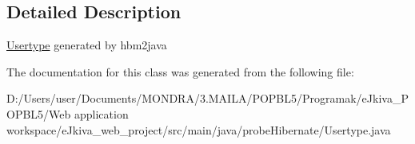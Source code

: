 \subsection{Detailed Description}
\mbox{\hyperlink{classprobe_hibernate_1_1_usertype}{Usertype}} generated by hbm2java 

The documentation for this class was generated from the following file\+:\begin{DoxyCompactItemize}
\item 
D\+:/\+Users/user/\+Documents/\+M\+O\+N\+D\+R\+A/3.\+M\+A\+I\+L\+A/\+P\+O\+P\+B\+L5/\+Programak/e\+Jkiva\+\_\+\+P\+O\+P\+B\+L5/\+Web application workspace/e\+Jkiva\+\_\+web\+\_\+project/src/main/java/probe\+Hibernate/Usertype.\+java\end{DoxyCompactItemize}
